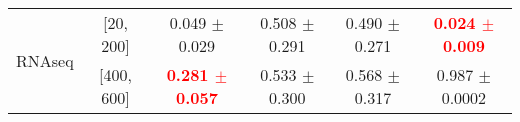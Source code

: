 \documentclass[12pt]{article}
\begin{document}
\begin{table}[t]
\begin{tabular}{lccccc}
         \hline
         \multirow{2}{*}{RNAseq } & [20, 200] & 0.049 $\pm$ 0.029 & 0.508 $\pm$ 0.291 & 0.490 $\pm$ 0.271 & \textbf{\textcolor{red}{0.024 $\pm$ 0.009}}\\
         & [400, 600] & \textbf{\textcolor{red}{0.281 $\pm$ 0.057}} & 0.533 $\pm$ 0.300  & 0.568 $\pm$ 0.317 & 0.987 $\pm$ 0.0002\\
         \hline
    \end{tabular}
    \label{tab:2-Wasserstein-error}
\end{table}
\end{document}
